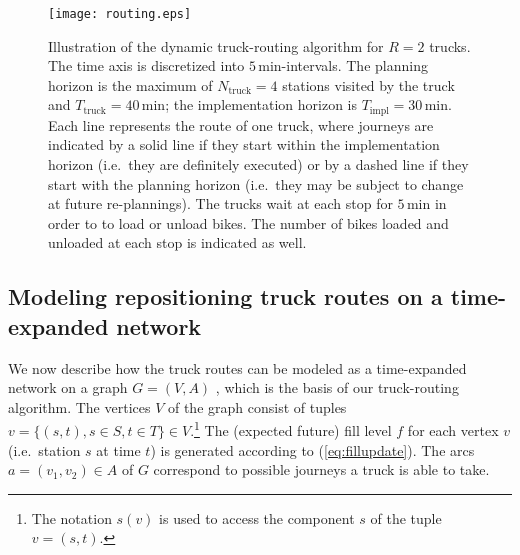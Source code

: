 \documentclass{article}
\providecommand{\Ntruck}{N_{\textrm{truck}}}
\providecommand{\Ttruck}{T_{\textrm{truck}}}
\begin{document}
\begin{figure}[t]
    \centering
    \texttt{[image: routing.eps]}
    \caption{Illustration of the dynamic truck-routing algorithm for $R=2$
      trucks. The time axis is discretized into $5\,\text{min}$-intervals. The
      planning horizon is the maximum of $\Ntruck=4$ stations visited by the
      truck and $\Ttruck=40\,\text{min}$; the implementation horizon is
      $T_{\textrm{impl}}=30\,\text{min}$. Each line represents the route of one
      truck, where journeys are indicated by a solid line if they start within
      the implementation horizon (i.e.\ they are definitely executed) or by a
      dashed line if they start with the planning horizon (i.e.\ they may be
      subject to change at future re-plannings). The trucks wait at each stop
      for $5\,\text{min}$ in order to to load or unload bikes. The number of
      bikes loaded and unloaded at each stop is indicated as well.
      \label{fig:truckroute}}
\end{figure}

\subsection{Modeling repositioning truck routes on a time-expanded network}
\label{sec:stationtime}
We now describe how the truck routes can be modeled as a time-expanded network
on a graph $G=(V,A)$ \cite{kek_decision_2009,contardo_balancing_2012}, which is
the basis of our truck-routing algorithm. The vertices $V$ of the graph consist
of tuples $v=\{(s,t),s\in S,t\in T\}\in V$.\footnote{The notation $s(v)$ is used
  to access the component $s$ of the tuple $v=(s,t)$.} The (expected future)
fill level $f$ for each vertex $v$ (i.e.\ station $s$ at time $t$) is generated
according to (\ref{eq:fillupdate}). The arcs $a = (v_1, v_2) \in A$ of $G$
correspond to possible journeys a truck is able to take.
\end{document}
